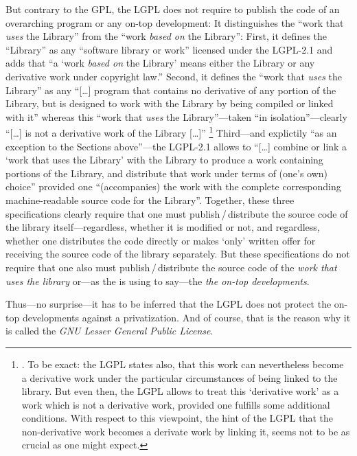 But contrary to the GPL, the LGPL does not require to publish the code of an
overarching program or any on-top development: It distinguishes the
\enquote{work that \emph{uses} the Library} from the \enquote{work \emph{based
on} the Library}: First, it defines the \enquote{Library} as any
\enquote{software library or work} licensed under the LGPL-2.1 and adds that
\enquote{a `work \emph{based on} the Library' means either the Library or any
derivative work under copyright law.} 
Second, it defines the \enquote{work that \emph{uses} the Library} as any
\enquote{[\ldots] program that contains no derivative of any portion of the
Library, but is designed to work with the Library by being compiled or linked
with it} whereas this \enquote{work that \emph{uses} the Library}---taken
\enquote{in isolation}---clearly \enquote{[\ldots] is not a derivative work of
the Library [\ldots]}%
  \footnote{\cite[cf.][\nopage wp. §5, emphasis ours]{Lgpl21OsiLicense1999a}. To
  be exact: the LGPL states also, that this work can nevertheless become a
  derivative work under the particular circumstances of being linked to the
  library. But even then, the LGPL allows to treat this `derivative work' as a
  work which is not a derivative work, provided one fulfills some additional
  conditions. With respect to this viewpoint, the hint of the LGPL that the
  non-derivative work becomes a derivate work by linking it, seems not to be as
  crucial as one might expect.}
Third---and explictily \enquote{as an exception to the Sections above}---the
LGPL-2.1 allows to \enquote{[\ldots] combine or link a \enquote{work that uses
the Library} with the Library to produce a work containing portions of the
Library, and distribute that work under terms of (one's own) choice} provided
one \enquote{(accompanies) the work with the complete corresponding
machine-readable source code for the Library}. Together, these three
specifications clearly require that one must publish\,/\,distribute the source
code of the library itself---regardless, whether it is modified or not, and
regardless, whether one distributes the code directly or makes `only' written
offer for receiving the source code of the library separately.
But these  specifications do not require that one also must publish\,/\,distribute
the source code of the \emph{work that uses the library} or---as the \oslic{} is
using to say---the \emph{the on-top developments}.

Thus---no surprise---it has to be inferred that the LGPL does not protect the
on-top developments against a privatization. And of course, that is the reason why
it is called the \emph{GNU \emph{Lesser} General Public License}.


